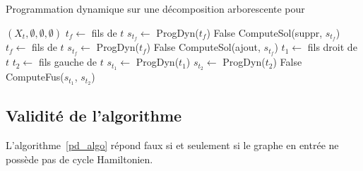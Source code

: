 \begin{algorithm}
    \caption{Programmation dynamique sur une décomposition arborescente pour \hcycle}
    \label{pd_algo}
    \begin{algorithmic}[1]
                \State \Return $(X_t, \emptyset, \emptyset, \emptyset)$
            \EndIf
                \State $t_f \gets$ fils de $t$
                \State $s_{t_f} \gets$ ProgDyn($t_f$)
                    \State \Return False
                \EndIf
                \State \Return ComputeSol(suppr, $s_{t_f}$)
            \EndIf
                \State $t_f \gets$ fils de $t$
                \State $s_{t_f} \gets$ ProgDyn($t_f$)
                    \State \Return False
                \EndIf
                \State \Return ComputeSol(ajout, $s_{t_f}$)
            \EndIf
                \State $t_1 \gets$ fils droit de $t$
                \State $t_2 \gets$ fils gauche de $t$
                \State $s_{t_1} \gets$ ProgDyn($t_1$)
                \State $s_{t_2} \gets$ ProgDyn($t_2$)
                    \State \Return False
                \EndIf
                \State \Return ComputeFus($s_{t_1}$, $s_{t_2}$)
            \EndIf
        \EndFunction
    \end{algorithmic}
\end{algorithm}

\subsection{Validité de l'algorithme}

\begin{nthrm}
    L'algorithme~\ref{pd_algo} répond faux si et seulement si le graphe en entrée ne possède pas de cycle
    Hamiltonien.
\end{nthrm}


